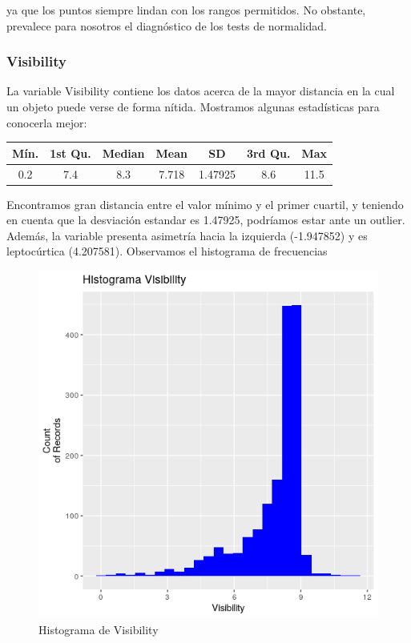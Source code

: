 ya que los puntos siempre lindan con los rangos permitidos. No obstante, prevalece para nosotros el diagnóstico de los tests de normalidad. 


\subsubsection{Visibility}

La variable Visibility contiene los datos acerca de la mayor distancia en la cual un objeto puede verse de forma nítida. Mostramos algunas estadísticas para conocerla mejor:

\begin{table}[H]
	\centering
	\begin{tabular}{|c|c|c|c|c|c|c|}
		\hline
		Mín. & 1st Qu. & Median & Mean  & SD      & 3rd Qu. & Max  \\ \hline
		0.2  & 7.4     & 8.3    & 7.718 & 1.47925 & 8.6     & 11.5 \\ \hline
	\end{tabular}
\end{table}


Encontramos gran distancia entre el valor mínimo y el primer cuartil, y teniendo en cuenta que la desviación estandar es 1.47925, podríamos estar ante un outlier. Además, la variable presenta asimetría hacia la izquierda (-1.947852) y es leptocúrtica (4.207581). Observamos el histograma de frecuencias

\begin{figure}[H] %
	\centering
	\includegraphics[scale=0.7]{hist-vis.png}  %
	\caption{Histograma de Visibility} 
	\label{fig:hist-vis}
\end{figure}

